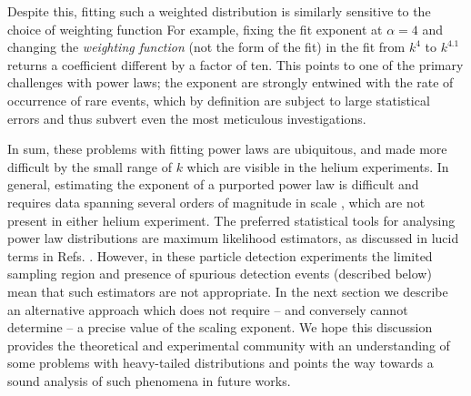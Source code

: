 	Despite this, fitting such a weighted distribution is similarly sensitive to the choice of weighting function
	For example, fixing the fit exponent at $\alpha=4$ and changing the \emph{weighting function} (not the form of the fit) in the fit from $k^4$ to $k^{4.1}$ returns a coefficient different by a factor of ten.
	This points to one of the primary challenges with power laws; the exponent are strongly entwined with the rate of occurrence of rare events, which by definition are subject to large statistical errors and thus subvert even the most meticulous investigations.

	In sum, these problems with fitting power laws are ubiquitous, and made more difficult by the small range of $k$ which are visible in the helium experiments.
	In general, estimating the exponent of a purported power law is difficult and requires data spanning several orders of magnitude in scale \cite{Goldstein04,Clauset09,Virkar14,Hanel17}, which are not present in either helium experiment.
	The preferred statistical tools for analysing power law distributions are maximum likelihood estimators, as discussed in lucid terms in Refs.
	\cite{Clauset09,Virkar14}.
	However, in these particle detection experiments the limited sampling region and presence of spurious detection events (described below) mean that such estimators are not appropriate.
	In the next section we describe an alternative approach which does not require -- and conversely cannot determine -- a precise value of the scaling exponent.
	We hope this discussion provides the theoretical and experimental community with an understanding of some problems with heavy-tailed distributions and points the way towards a sound analysis of such phenomena in future works.
	
